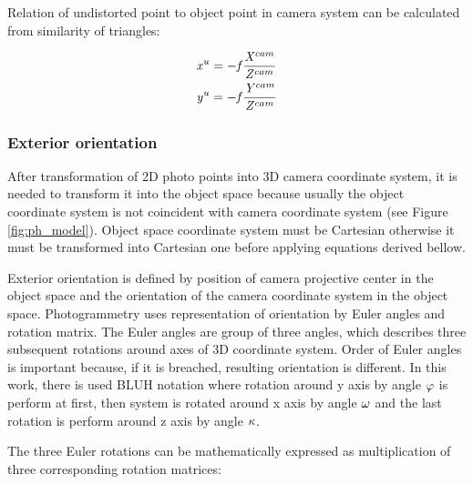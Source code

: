 \documentclass[a4paper,12pt]{article}
\newcommand{\escal}[1]{%
{\it #1}%
}
\begin{document}
Relation of undistorted point to object point in camera system can be calculated from 
similarity of triangles:

\begin{equation}
\begin{split}
&\escal{x}^{u} =  - \escal{f} \frac{\escal{X}^{cam}}{\escal{Z}^{cam}}   \\
&\escal{y}^{u} = - \escal{f} \frac{\escal{Y}^{cam}}{\escal{Z}^{cam}} 
\end{split}
\end{equation}


\subsubsection{Exterior orientation}
\label{sec:eo}

After transformation of 2D photo points into 3D camera coordinate system, it is needed to transform it into the object space
because usually the object coordinate system is not coincident with camera coordinate system (see Figure \ref{fig:ph_model}). 
Object space coordinate system must be Cartesian otherwise it must be transformed into Cartesian one before applying equations 
derived bellow. 


Exterior orientation is defined by position of camera projective center in the object space and the orientation of the camera coordinate system in the object space.
Photogrammetry uses representation of orientation by Euler angles and rotation matrix.
The Euler angles are group of three angles, which describes three subsequent rotations
 around axes of 3D coordinate system. 
 Order of Euler angles is important because, if it is breached, resulting orientation is different. 
 In this work, there is used BLUH notation \cite{baumker2001new} where rotation around y axis by angle $\escal{\varphi}$ is 
 perform at first, then system is rotated around x axis  by angle $\escal{\omega}$ and
 the last rotation is perform around z axis by angle $\escal{\kappa}$.
 
The three Euler rotations can be mathematically expressed as multiplication of three corresponding
rotation matrices:


\end{document}
